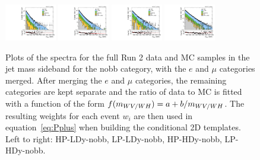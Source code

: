 \begin{figure}[htbp]
  \centering
  \includegraphics[width=0.2\textwidth]{fig/2Dfit/slopesSB_b1_allL_HP_nobb_LDy_Run2_mWV_1OverX.pdf}
  \includegraphics[width=0.2\textwidth]{fig/2Dfit/slopesSB_b1_allL_LP_nobb_LDy_Run2_mWV_1OverX.pdf}
  \includegraphics[width=0.2\textwidth]{fig/2Dfit/slopesSB_b1_allL_HP_nobb_HDy_Run2_mWV_1OverX.pdf}
  \includegraphics[width=0.2\textwidth]{fig/2Dfit/slopesSB_b1_allL_LP_nobb_HDy_Run2_mWV_1OverX.pdf}\\
  \caption{
    Plots of the \MVV spectra for the full Run 2 data and MC samples in the jet mass sideband for the nobb category, with the $e$ and $\mu$ categories merged.
    After merging the $e$ and $\mu$ categories, the remaining categories are kept separate and the ratio of data to MC is fitted with a function of the form $f(m_{WV/WH})=a+b/m_{WV/WH}$.
    The resulting weights for each event $w_i$ are then used in equation~\ref{eq:Pplus} when building the conditional 2D templates.
    Left to right: HP-LDy-nobb, LP-LDy-nobb, HP-HDy-nobb, LP-HDy-nobb.
  }
  \label{fig:nonResMvvSpectrumReweighting}
\end{figure}

